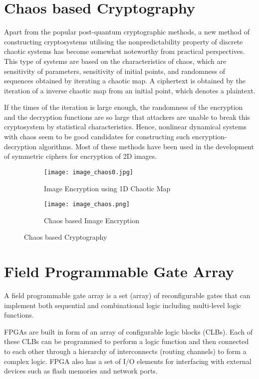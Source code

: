 \section{Chaos based Cryptography}
Apart from the popular post-quantum cryptographic methods, a new method of constructing cryptosystems utilising the nonpredictability property of discrete chaotic systems has become somewhat noteworthy from practical perspectives. This type of systems are based on the characteristics of chaos, which are sensitivity of parameters, sensitivity of initial points, and randomness of sequences obtained by iterating a chaotic map. A ciphertext is obtained by the iteration of a inverse chaotic map from an initial point, which denotes a plaintext. 

If the times of the iteration is large enough, the randomness of the encryption and the decryption functions are so large that attackers are unable to break this cryptosystem by statistical characteristics. Hence, nonlinear dynamical systems with chaos seem to be good candidates for constructing such encryption-decryption algorithms. Most of these methods have been used in the development of symmetric ciphers for encryption of 2D images.

\begin{figure}[H]
\begin{subfigure}{0.5\textwidth}
\texttt{[image: image\_chaos0.jpg]}
\caption{Image Encryption using 1D Chaotic Map}\label{fig:image_chaos0}
\end{subfigure}
\begin{subfigure}{0.5\textwidth}
\texttt{[image: image\_chaos.png]}
\caption{Chaos based Image Encryption}\label{fig:image_chaos}
\end{subfigure}
\caption{Chaos based Cryptography}\label{fig:image0}
\end{figure}

\section{Field Programmable Gate Array}
A field programmable gate array is a set (array) of reconfigurable gates that can implement both sequential and combinational logic including multi-level logic functions.

FPGAs are built in form of an array of configurable logic blocks (CLBs). Each of these CLBs can be programmed to perform a logic function and then connected to each other through a hierarchy of interconnects (routing channels) to form a complex logic. FPGA also has a set of I/O elements for interfacing with external devices such as flash memories and network ports.

